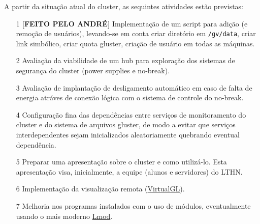 A partir da situação atual do cluster, as sequintes atividades estão previstas:
\begin{itemize}
	\item[1] \textbf{[FEITO PELO ANDRÉ]} Implementação de um script para adição (e remoção de usuários), levando-se em conta criar diretório em \texttt{/gv/data}, criar link simbólico, criar quota gluster, criação de usuário em todas as máquinas.%
	\item[2] Avaliação da viabilidade de um hub para exploração dos sistemas de segurança do cluster (power supplies e no-break).
	\item[3] Avaliação de implantação de desligamento automático em caso de falta de energia atráves de conexão lógica com o sistema de controle do no-break.
	\item[4] Configuração fina das dependências entre serviços de monitoramento 
	do cluster e do sistema de arquivos gluster, de modo a evitar que serviços 
	interdependentes sejam inicializados aleatoriamente quebrando eventual 
	dependência.
	\item[5] Preparar uma apresentação sobre o cluster e como utilizá-lo. Esta apresentação visa, inicialmente, a equipe (alunos e servidores) do LTHN.
        \item[6] Implementação da visualização remota (\href{https://www.virtualgl.org/}{VirtualGL}).  
        \item[7] Melhoria nos programas instalados com o uso de módulos, eventualmente usando o mais moderno \href{https://lmod.readthedocs.io/en/latest/}{Lmod}.
\end{itemize}

